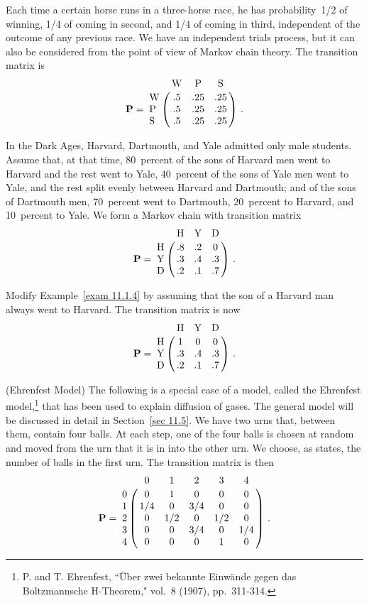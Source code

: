 \begin{example}\label{exam 11.1.3}
Each time a certain horse runs in a three-horse race, he has probability~1/2 of
winning, 1/4 of coming in second, and 1/4 of coming in third, independent of
the
outcome of any previous race.  We have an independent trials process, but it
can also
be considered from the point of view of Markov chain theory.  The transition
matrix
is
$$
\mat{P} = \bordermatrix{
        & \mbox{W} & \mbox{P} & \mbox{S} \cr
\mbox{W} &      .5 &      .25 &      .25 \cr
\mbox{P} &      .5 &      .25 &      .25 \cr
\mbox{S} &      .5 &      .25 &      .25}\ .
$$
\end{example}
\vskip -3pt
\begin{example}\label{exam 11.1.4}
In the Dark Ages, Harvard, Dartmouth, and Yale admitted only male students. 
Assume that, at that time, 80~percent of the sons of Harvard men went to
Harvard
and the rest went to Yale, 40~percent of the sons of Yale men went to Yale, and
the rest split evenly between Harvard and Dartmouth; and of the sons of
Dartmouth men, 70~percent went to Dartmouth, 20~percent to Harvard, and
10~percent to Yale.  We form a Markov chain with transition matrix
$$
\mat{P} = \bordermatrix{
        & \mbox{H} & \mbox{Y} & \mbox{D} \cr
\mbox{H} &      .8 &      .2 &       0 \cr
\mbox{Y} &      .3 &      .4 &      .3 \cr 
\mbox{D} &      .2 &      .1 &      .7}\ .
$$
\end{example}
\vskip -3pt
\begin{example}\label{exam 11.1.5}
Modify Example~\ref{exam 11.1.4} by assuming that the son of a Harvard man
always went
to Harvard.  The transition matrix is now
$$
\mat{P} = \bordermatrix{
        & \mbox{H} & \mbox{Y} & \mbox{D} \cr
\mbox{H} &       1 &       0 &       0 \cr
\mbox{Y} &      .3 &      .4 &      .3 \cr
\mbox{D} &      .2 &      .1 &      .7}\ .
$$
\end{example}
\vskip -3pt
\begin{example}\label{exam 11.1.6}
(Ehrenfest Model) The following is a special case of a model, called the
Ehrenfest
model,\footnote{P. and T. Ehrenfest, ``\"{U}ber zwei bekannte Einw\"{a}nde
gegen das
Boltzmannsche  H-Theorem,"  vol.~8 (1907),
pp.~311-314.}
that has been used to explain diffusion of gases.  The general model will be
discussed in detail in Section~\ref{sec 11.5}.  We have two urns that, between
them,
contain four balls.  At each step, one of the four balls is chosen at random
and
moved from the urn that it is in into the other urn.  We choose, as states, the
number of balls in the first urn.  The transition matrix is then
$$
 \mat {P} = \bordermatrix{
  &  0  &  1  &  2  &  3  &  4  \cr
0 &  0  &  1  &  0  &  0  &  0  \cr
1 & 1/4 &  0  & 3/4 &  0  &  0  \cr
2 &  0  & 1/2 &  0  & 1/2 &  0  \cr
3 &  0  &  0  & 3/4 &  0  & 1/4 \cr
4 &  0  &  0  &  0  &  1  &  0 \cr}\ . 
$$
\end{example}

